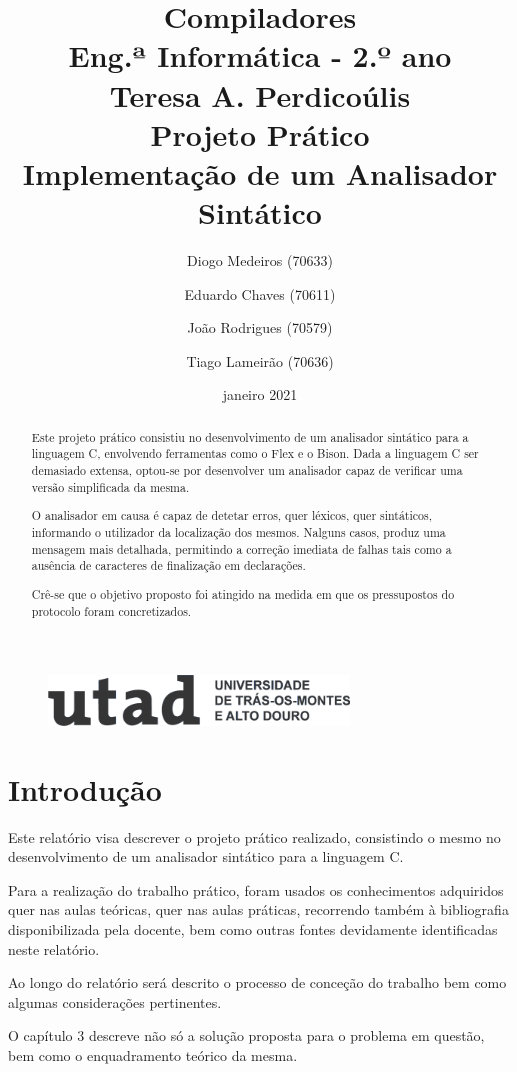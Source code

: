 \documentclass{report}
\title{{\bf Compiladores}\\Eng.ª Informática - 2.º ano\\ Teresa A. Perdicoúlis\\ \vspace*{3cm}\textbf{Projeto Prático}\\ Implementação de um Analisador Sintático \vspace*{1cm}}
\author{Diogo Medeiros (70633) \and Eduardo Chaves (70611) \and João Rodrigues (70579) \and Tiago Lameirão (70636)}
\date{janeiro 2021}
\begin{document}
\begin{figure}
\includegraphics[width=8cm]{utad}
\end{figure}

\maketitle

\begin{abstract}

Este projeto prático consistiu no desenvolvimento de um analisador sintático para a linguagem C, envolvendo ferramentas como o Flex e o Bison. Dada a linguagem C ser demasiado extensa, optou-se por desenvolver um analisador capaz de verificar uma versão simplificada da mesma. 

O analisador em causa é capaz de detetar erros, quer léxicos, quer sintáticos, informando o utilizador da localização dos mesmos. Nalguns casos, produz uma mensagem mais detalhada, permitindo a correção imediata de falhas tais como a ausência de caracteres de finalização em declarações.

Crê-se que o objetivo proposto foi atingido na medida em que os pressupostos do protocolo foram concretizados.

\end{abstract}

\tableofcontents

\chapter{Introdução}

Este relatório visa descrever o projeto prático realizado, consistindo o mesmo no desenvolvimento de um analisador sintático para a linguagem C. 

Para a realização do trabalho prático, foram usados os conhecimentos adquiridos quer nas aulas teóricas, quer nas aulas práticas, recorrendo também à bibliografia disponibilizada pela docente, bem como outras fontes devidamente identificadas neste relatório.

Ao longo do relatório será descrito o processo de conceção do trabalho bem como algumas considerações pertinentes.

O capítulo 3 descreve não só a solução proposta para o problema em questão, bem como o enquadramento teórico da mesma.
\end{document}
